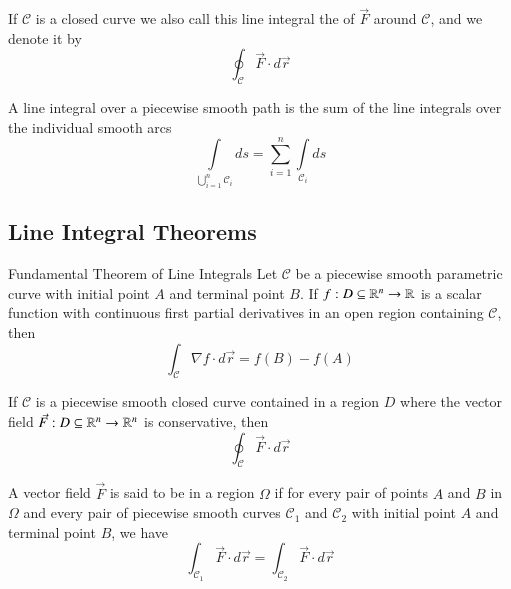 \documentclass[12pt]{report}
\begin{document}
\begin{appendices}
    \begin{defn}{}{}
        If $\mathcal{C}$ is a closed curve we also call this line integral the  of $\vec{F}$ around $\mathcal{C}$, and we denote it by \begin{equation}
            \oint_{\mathcal{C}}\vec{F} \cdot d\vec{r}
        \end{equation}
    \end{defn}
    
    \begin{rmk}{}{}
        A line integral over a piecewise smooth path is the sum of the line integrals over the individual smooth arcs \begin{equation}
            \int\limits_{\bigcup_{i=1}^n\mathcal{C}_i}ds = \sum\limits_{i=1}^n\int\limits_{\mathcal{C}_i}ds
        \end{equation}
    \end{rmk}
    
    \subsection{Line Integral Theorems}
    
    \begin{namthm}{Fundamental Theorem of Line Integrals}
        Let $\mathcal{C}$ be a piecewise smooth parametric curve with initial point $A$ and terminal point $B$. If $f:D \subseteq \mathbb R^n \rightarrow \mathbb R$ is a scalar function with continuous first partial derivatives in an open region containing $\mathcal{C}$, then \begin{equation}
            \int_{\mathcal{C}}\nabla f\cdot d\vec{r} = f(B) - f(A)
        \end{equation} 
    \end{namthm}
    
    \begin{cor}{}{}
        If $\mathcal{C}$ is a piecewise smooth closed curve contained in a region $D$ where the vector field $\vec{F}:D\subseteq \mathbb R^n\rightarrow \mathbb R^n$ is conservative, then \begin{equation}
            \oint_{\mathcal{C}}\vec{F}\cdot d\vec{r}
        \end{equation}
    \end{cor}
    
    \begin{defn}{}{}
        A vector field $\vec{F}$ is said to be  in a region $\Omega$ if for every pair of points $A$ and $B$ in $\Omega$ and every pair of piecewise smooth curves $\mathcal{C}_1$ and $\mathcal{C}_2$ with initial point $A$ and terminal point $B$, we have \begin{equation}
            \int_{\mathcal{C}_1}\vec{F}\cdot d\vec{r} = \int_{\mathcal{C}_2}\vec{F}\cdot d\vec{r}
        \end{equation}
    \end{defn}
    

\end{appendices}
\end{document}

